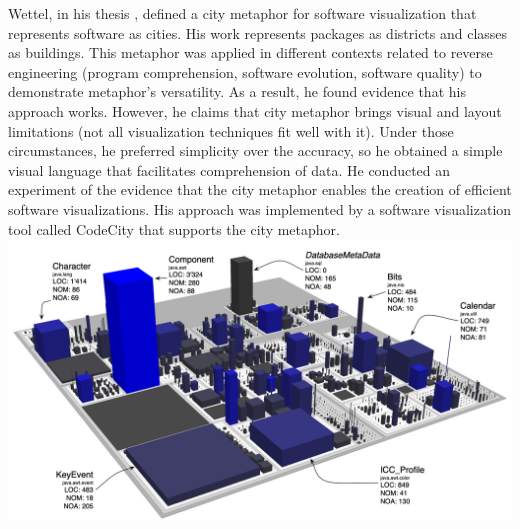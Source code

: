 Wettel, in his thesis \cite{Wettel2011}, defined a city metaphor for software visualization that represents software as cities.
 His work represents packages as districts and classes as buildings.
  This metaphor was applied in different contexts related to reverse engineering (program comprehension, software evolution, software quality)
   to demonstrate metaphor's versatility. As a result, he found evidence that his approach works.
    However, he claims that city metaphor brings visual and layout limitations 
    (not all visualization techniques fit well with it). Under those circumstances, he preferred simplicity over the accuracy,
     so he obtained a simple visual language that facilitates comprehension of data. He conducted an experiment of the evidence that the city
      metaphor enables the creation of efficient software visualizations. His approach was implemented by a software visualization tool 
      called CodeCity that supports the city metaphor. 
\includegraphics[width=\textwidth]{CodeCity.png}


